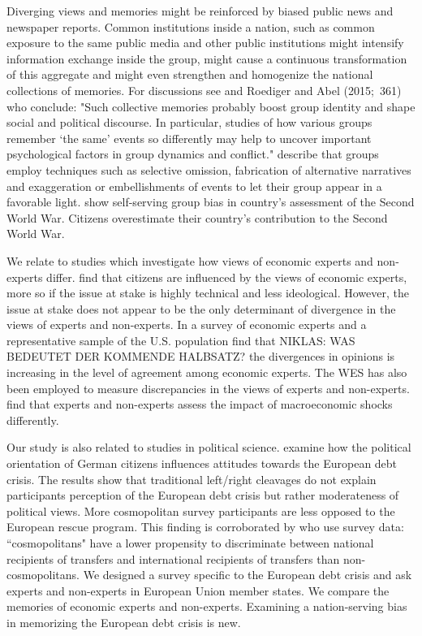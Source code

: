 Diverging views and memories might be reinforced 
by biased public news and newspaper reports. Common
institutions inside a nation, such as common exposure to the same public
media and other public institutions might intensify information exchange
inside the group, might cause a continuous transformation of this aggregate
and might even strengthen and homogenize the national collections of
memories. For discussions see \cite{rigney} and Roediger and Abel (2015;\
361) who conclude: "Such collective memories probably boost group identity
and shape social and political discourse. In particular, studies of how
various groups remember `the same' events so differently may help to uncover
important psychological factors in group dynamics and conflict." \cite{baumeister} describe that groups employ techniques such as selective omission, fabrication of alternative narratives and exaggeration or embellishments of events to let their group appear in a favorable light. \cite{abel} show self-serving group bias in country's assessment of the Second World War. Citizens overestimate their country's contribution to the Second World War. 

We relate to studies which investigate how views of economic experts and non-experts differ. \cite{johnston} find that citizens are influenced by the views of economic experts, more so if the issue at stake is highly technical and less ideological. However, the issue at stake does not appear to be the only determinant of divergence in the views of experts and non-experts. In a survey of economic experts and a representative sample of the U.S. population \cite{sapienza} find that NIKLAS: WAS BEDEUTET DER KOMMENDE HALBSATZ? the divergences in opinions is increasing in the level of agreement among economic experts. The WES has also been employed to measure discrepancies in the views of experts and non-experts. \cite{roth} find that experts and non-experts assess the impact of macroeconomic shocks differently.

Our study is also related to studies in political science.
\cite{bechtel} examine how the political orientation of German citizens influences attitudes towards the European debt crisis. The results show that traditional left/right cleavages do not explain participants perception of the European debt crisis but rather moderateness of political views. More cosmopolitan survey participants are less opposed to the European rescue program. This finding is corroborated by \cite{kuhn} who use survey data: ``cosmopolitans" have a lower propensity to discriminate between national recipients of transfers and international recipients of transfers than non-cosmopolitans. We designed a survey specific to the European debt crisis and ask experts and non-experts in European Union member states. We compare the memories of economic experts and non-experts. Examining a nation-serving bias in memorizing the European debt crisis is new. 


